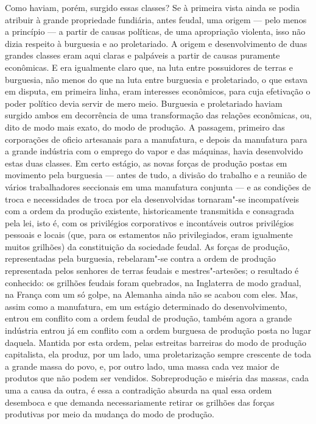 Como haviam, porém, surgido essas classes? Se à primeira vista ainda
se podia atribuir à grande propriedade fundiária, antes feudal, uma
origem --- pelo menos a princípio --- a partir de causas políticas,
de uma apropriação violenta, isso não dizia respeito à burguesia
e ao proletariado. A origem e desenvolvimento de duas grandes classes
eram aqui claras e palpáveis a partir de causas puramente econômicas. E %
era igualmente claro que, na luta entre possuidores de terras e
burguesia, não menos do que na luta entre burguesia e proletariado, o
que estava em disputa, em primeira linha, eram interesses econômicos, %
para cuja efetivação o poder político devia servir de mero meio.
Burguesia e proletariado haviam surgido ambos em decorrência de uma
transformação das relações econômicas, ou, dito de modo mais exato, do modo
de produção. A passagem, primeiro das corporações de oficio artesanais
para a manufatura, e depois da manufatura para a grande indústria com o
emprego do vapor e das máquinas, havia desenvolvido estas duas classes.
Em certo estágio, as novas forças de produção postas em movimento pela
burguesia --- antes de tudo, a divisão do trabalho e a reunião de vários
trabalhadores seccionais em uma manufatura conjunta --- e as condições de
troca e necessidades de troca por ela desenvolvidas tornaram"-se
incompatíveis com a ordem da produção existente, historicamente
transmitida e consagrada pela lei, isto é, com os privilégios
corporativos e incontáveis outros privilégios pessoais e locais (que,
para os estamentos não privilegiados, eram igualmente muitos grilhões)
da constituição da sociedade feudal. As forças de produção,
representadas pela burguesia, rebelaram"-se contra a ordem de produção
representada pelos senhores de terras feudais e mestres"-artesões; o
resultado é conhecido: os grilhões feudais foram quebrados, na
Inglaterra de modo gradual, na França com um só golpe, na Alemanha ainda %
não se acabou com eles. Mas, assim como a manufatura, em um estágio
determinado do desenvolvimento, entrou em conflito com a ordem feudal de %
produção, também agora a grande indústria entrou já em conflito com a
ordem burguesa de produção posta no lugar daquela. Mantida por esta
ordem, pelas estreitas barreiras do modo de produção capitalista, ela
produz, por um lado, uma proletarização sempre crescente de toda a
grande massa do povo, e, por outro lado, uma massa cada vez maior de
produtos que não podem ser vendidos. Sobreprodução e miséria das massas,
cada uma a causa da outra, é essa a contradição absurda na qual essa
ordem desemboca e que demanda necessariamente retirar os grilhões das
forças produtivas por meio da mudança do modo de produção.


